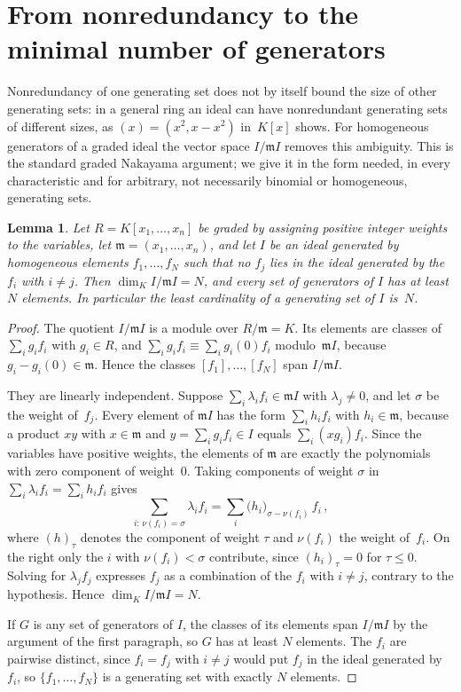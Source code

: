 \documentclass[11pt,letterpaper]{article}
\numberwithin{equation}{section}
\theoremstyle{plain}
\newtheorem{lemma}[theorem]{Lemma}
\theoremstyle{remark}
\newcommand{\mm}{\mathfrak{m}}
\begin{document}
\section{From nonredundancy to the minimal number of generators}\label{sec:mu}

Nonredundancy of one generating set does not by itself bound the size of other generating sets: in a general ring an ideal can have nonredundant generating sets of different sizes, as $(x)=(x^2,x-x^2)$ in~$K[x]$ shows. For homogeneous generators of a graded ideal the vector space $I/\mm I$ removes this ambiguity. This is the standard graded Nakayama argument; we give it in the form needed, in every characteristic and for arbitrary, not necessarily binomial or homogeneous, generating sets.

\begin{lemma}\label{lem:graded}
Let $R=K[x_1,\dots,x_n]$ be graded by assigning positive integer weights to the variables, let $\mm=(x_1,\dots,x_n)$, and let $I$ be an ideal generated by homogeneous elements $f_1,\dots,f_N$ such that no $f_j$ lies in the ideal generated by the $f_i$ with $i\ne j$. Then $\dim_K I/\mm I=N$, and every set of generators of $I$ has at least $N$ elements. In particular the least cardinality of a generating set of $I$ is~$N$.
\end{lemma}

\begin{proof}
The quotient $I/\mm I$ is a module over $R/\mm=K$. Its elements are classes of $\sum_ig_if_i$ with $g_i\in R$, and $\sum_ig_if_i\equiv\sum_ig_i(0)f_i$ modulo~$\mm I$, because $g_i-g_i(0)\in\mm$. Hence the classes $[f_1],\dots,[f_N]$ span $I/\mm I$.

They are linearly independent. Suppose $\sum_i\lambda_if_i\in\mm I$ with $\lambda_j\ne 0$, and let $\sigma$ be the weight of~$f_j$. Every element of $\mm I$ has the form $\sum_ih_if_i$ with $h_i\in\mm$, because a product $xy$ with $x\in\mm$ and $y=\sum_ig_if_i\in I$ equals $\sum_i(xg_i)f_i$. Since the variables have positive weights, the elements of $\mm$ are exactly the polynomials with zero component of weight~$0$. Taking components of weight $\sigma$ in $\sum_i\lambda_if_i=\sum_ih_if_i$ gives
\begin{equation*}
\sum_{i:\,\nu(f_i)=\sigma}\lambda_if_i=\sum_i\bigl(h_i\bigr)_{\sigma-\nu(f_i)}\,f_i\,,
\end{equation*}
where $(h)_\tau$ denotes the component of weight $\tau$ and $\nu(f_i)$ the weight of~$f_i$. On the right only the $i$ with $\nu(f_i)<\sigma$ contribute, since $(h_i)_\tau=0$ for $\tau\le 0$. Solving for $\lambda_jf_j$ expresses $f_j$ as a combination of the $f_i$ with $i\ne j$, contrary to the hypothesis. Hence $\dim_KI/\mm I=N$.

If $G$ is any set of generators of $I$, the classes of its elements span $I/\mm I$ by the argument of the first paragraph, so $G$ has at least $N$ elements. The $f_i$ are pairwise distinct, since $f_i=f_j$ with $i\ne j$ would put $f_j$ in the ideal generated by~$f_i$, so $\{f_1,\dots,f_N\}$ is a generating set with exactly $N$ elements.
\end{proof}
\end{document}
